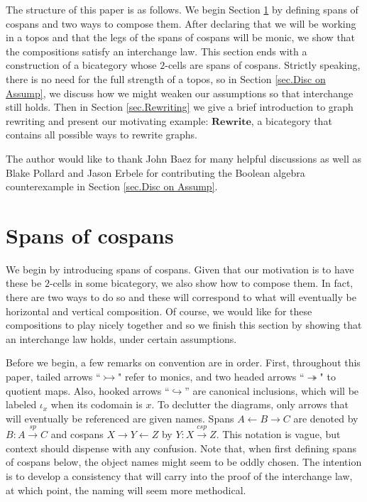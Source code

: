 \documentclass[11pt]{amsart}
\newcommand{\cat}[1]{\mathbf{#1}}
\newcommand{\from}{\colon}
\renewcommand{\span}{\xrightarrow{\mathit{sp}}}
\newcommand{\cospan}{\xrightarrow{\mathit{csp}}}
\theoremstyle{remark}
\theoremstyle{definition}
\begin{document}
The structure of this paper is as follows. We begin Section \ref{sec.SpansOfCospans} by defining spans of cospans and two ways to compose them. After declaring that we will be working in a topos and that the legs of the spans of cospans will be monic, we show that the compositions satisfy an interchange law.  This section ends with a construction of a bicategory whose $2$-cells are spans of cospans. Strictly speaking, there is no need for the full strength of a topos, so in Section \ref{sec.Disc on Assump}, we discuss how we might weaken our assumptions so that interchange still holds.  Then in Section \ref{sec.Rewriting} we give a brief introduction to graph rewriting and present our motivating example: $\cat{Rewrite}$, a bicategory that contains all possible ways to rewrite graphs.

The author would like to thank John Baez for many helpful discussions as well as Blake Pollard and Jason Erbele for contributing the Boolean algebra counterexample in Section \ref{sec.Disc on Assump}.
%
%
%
%
%
%
%
%
%
%
%
%
%
\section{Spans of cospans} %
\label{sec.SpansOfCospans}
%

We begin by introducing spans of cospans.  Given that our motivation is to have these be $2$-cells in some bicategory, we also show how to compose them.  In fact, there are two ways to do so and these will correspond to what will eventually be horizontal and vertical composition. Of course, we would like for these compositions to play nicely together and so we finish this section by showing that an interchange law holds, under certain assumptions. 

Before we begin, a few remarks on convention are in order. First, throughout this paper, tailed arrows ``$\rightarrowtail$" refer to monics, and two headed arrows ``$\twoheadrightarrow$" to quotient maps. Also, hooked arrows ``$\hookrightarrow$'' are canonical inclusions, which will be labeled $\iota_x$ when its codomain is $x$. To declutter the diagrams, only arrows that will eventually be referenced are given names. Spans $A \leftarrow B \to C$ are denoted by $B \from A \span C$ and cospans $X \to Y \leftarrow Z$ by $Y \from X \cospan Z$. This notation is vague, but context should dispense with any confusion. Note that, when first defining spans of cospans below, the object names might seem to be oddly chosen. The intention is to develop a consistency that will carry into the proof of the interchange law, at which point, the naming will seem more methodical.
%
%
%
%
%
%
\end{document}
